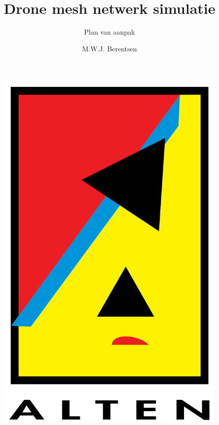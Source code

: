 \documentclass[a4paper, 11pt, oneside]{report}
\author{M.W.J. Berentsen}
\title{\myfont Drone mesh netwerk simulatie}
\subtitle{Plan van aanpak}{HAN Arnhem}{561399}{MWJ.Berentsen@student.han.nl}{Versie 2}{Alten Nederland B.V.}{Docent: J. Visch, MSc}{Assessor: ir. C.G.R. van Uffelen}
\begin{document}
\begin{figure}
\begin{center}\includegraphics[scale=0.1]{alten}\end{center}
\end{figure}
\maketitle

\end{document}
